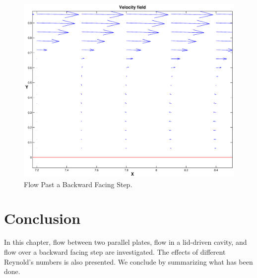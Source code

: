 \begin{figure}
\begin{center}
\includegraphics[scale=.3]{backstep_velocityfield1.eps}
\end{center}
\caption{Flow Past a Backward Facing Step.}
\label{bwfs2}
\end{figure}

\section{Conclusion}

In this chapter, flow between two parallel plates, flow in a lid-driven cavity, and flow over a backward facing step are investigated. The effects of different Reynold's numbers is also presented. We conclude by summarizing what has been done. 
%